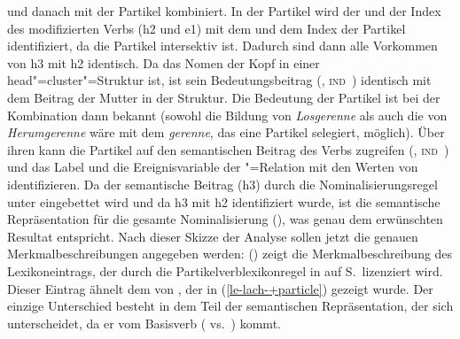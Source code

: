 und danach mit der Partikel kombiniert. In der Partikel wird der \ltopw und der Index des
modifizierten Verbs (h2 und e1) mit dem \ltopw und dem Index der Partikel identifiziert, da die
Partikel intersektiv ist. Dadurch sind dann alle Vorkommen von h3 mit h2 identisch. Da das Nomen 
der Kopf in einer head"=cluster"=Struktur ist, ist sein Bedeutungsbeitrag (\ltop {},
\textsc{ind} \,) 
identisch mit dem Beitrag der Mutter in der Struktur. Die Bedeutung der Partikel
ist bei der Kombination dann bekannt (sowohl die Bildung von \emph{Losgerenne}
als auch die von \emph{Herumgerenne} wäre mit dem \emph{gerenne}, das eine Partikel
selegiert, möglich). Über ihren \modw kann die Partikel auf den semantischen
Beitrag des Verbs zugreifen (\ltop {}, \textsc{ind} \,)  und das Label
und die Ereignisvariable der "=Relation mit den Werten von  identifizieren.
Da der semantische Beitrag (\ltop h3) durch die Nominalisierungsregel unter 
eingebettet wird und da h3 mit h2 identifiziert wurde, ist die semantische Repräsentation für die gesamte Nominalisierung (), was genau dem erwünschten Resultat entspricht.
\ea
{}
\z
{}
\noindent
Nach dieser Skizze der Analyse sollen jetzt die genauen Merkmalbeschreibungen angegeben werden:
() zeigt die Merkmalbeschreibung des Lexikoneintrags, der durch die Partikelverblexikonregel
in  auf S.\,\pageref{lr-pv} lizenziert wird. Dieser Eintrag ähnelt dem von , 
der in (\ref{le-lach-+particle}) gezeigt wurde. Der einzige Unterschied besteht
in dem Teil der semantischen Repräsentation, der sich unterscheidet,
da er vom Basisverb ( vs.\ ) kommt.

